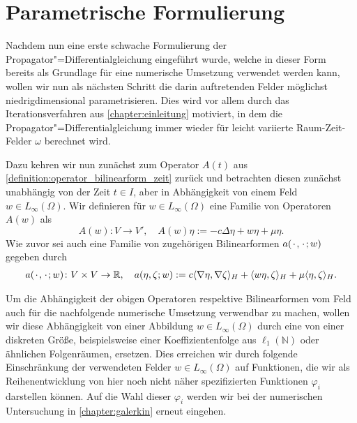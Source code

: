 \documentclass[../main.tex]{subfiles}
\begin{document}
\section{Parametrische Formulierung} %
\label{section:parametrische_formulierung}

Nachdem nun eine erste schwache Formulierung der Propagator"=Differentialgleichung eingeführt wurde, welche in dieser Form bereits als Grundlage für eine numerische Umsetzung verwendet werden kann, wollen wir nun als nächsten Schritt die darin auftretenden Felder möglichst niedrigdimensional parametrisieren.
Dies wird vor allem durch das Iterationsverfahren aus \cref{chapter:einleitung} motiviert, in dem die Propagator"=Differentialgleichung immer wieder für leicht variierte Raum-Zeit-Felder $\omega$ berechnet wird.

Dazu kehren wir nun zunächst zum Operator $A(t)$ aus \cref{definition:operator_bilinearform_zeit} zurück und betrachten diesen zunächst unabhängig von der Zeit $t \in I$, aber in Abhängigkeit von einem Feld $w \in L_{\infty}(\Omega)$.
Wir definieren für $w \in L_{\infty}(\Omega)$ eine Familie von Operatoren $A(w)$ als
\begin{equation}
    \label{eq:operator_feld}
    A(w) \colon V \to V', \quad A(w) \eta := - c \Delta \eta + w \eta + \mu \eta.
\end{equation}
Wie zuvor sei auch eine Familie von zugehörigen Bilinearformen $a({\mkern2mu\cdot\mkern2mu}, {\mkern2mu\cdot\mkern2mu}; w)$ gegeben durch
\begin{equation}
    \label{eq:bilinearform_feld}
    \begin{aligned}
        a({\mkern2mu\cdot\mkern2mu}, {\mkern2mu\cdot\mkern2mu}; w) \colon V \times V \to \mathbb{R}, \quad
        a(\eta, \zeta; w) := c\langle\nabla \eta,\nabla \zeta\rangle_{H} + \langle w \eta,\zeta\rangle_{H} + \mu \langle\eta,\zeta\rangle_{H}.
    \end{aligned}
\end{equation}

Um die Abhängigkeit der obigen Operatoren respektive Bilinearformen vom Feld auch für die nachfolgende numerische Umsetzung verwendbar zu machen, wollen wir diese Abhängigkeit von einer Abbildung $w \in L_{\infty}(\Omega)$ durch eine von einer diskreten Größe, beispielsweise einer Koeffizientenfolge aus $\ell_{1}(\mathbb{N})$ oder ähnlichen Folgenräumen, ersetzen.
Dies erreichen wir durch folgende Einschränkung der verwendeten Felder $w \in L_{\infty}(\Omega)$ auf Funktionen, die wir als Reihenentwicklung von hier noch nicht näher spezifizierten Funktionen $\varphi_{i}$ darstellen können.
Auf die Wahl dieser $\varphi_{i}$ werden wir bei der numerischen Untersuchung in \cref{chapter:galerkin} erneut eingehen.
\end{document}
